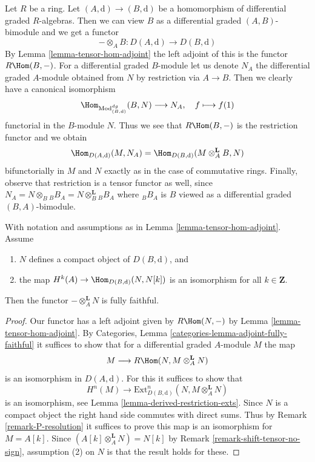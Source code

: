 \begin{example}
\label{example-map-hom-tensor}
Let $R$ be a ring. Let $(A, \text{d}) \to (B, \text{d})$ be a
homomorphism of differential graded $R$-algebras. Then we can
view $B$ as a differential graded $(A, B)$-bimodule and we get a functor
$$
- \otimes_A B : D(A, \text{d}) \longrightarrow D(B, \text{d})
$$
By Lemma \ref{lemma-tensor-hom-adjoint} the left adjoint of this
is the functor $R\Hom(B, -)$. For a differential graded $B$-module
let us denote $N_A$ the differential graded $A$-module obtained
from $N$ by restriction via $A \to B$. Then we clearly have
a canonical isomorphism
$$
\Hom_{\text{Mod}^{dg}_{(B, \text{d})}}(B, N) \longrightarrow N_A,\quad
f \longmapsto f(1)
$$
functorial in the $B$-module $N$. Thus we see that
$R\Hom(B, -)$ is the restriction functor and we obtain
$$
\Hom_{D(A, \text{d})}(M, N_A) =
\Hom_{D(B, \text{d})}(M \otimes^\mathbf{L}_A B, N)
$$
bifunctorially in $M$ and $N$ exactly as in the case of commutative rings.
Finally, observe that restriction is a tensor functor as well,
since $N_A = N \otimes_B {}_BB_A = N \otimes_B^\mathbf{L} {}_BB_A$
where ${}_BB_A$ is $B$ viewed as a differential graded $(B, A)$-bimodule.
\end{example}

\begin{lemma}
\label{lemma-tensor-with-compact-fully-faithful}
With notation and assumptions as in Lemma \ref{lemma-tensor-hom-adjoint}.
Assume
\begin{enumerate}
\item $N$ defines a compact object of $D(B, \text{d})$, and
\item the map $H^k(A) \to \Hom_{D(B, \text{d})}(N, N[k])$ is an
isomorphism for all $k \in \mathbf{Z}$.
\end{enumerate}
Then the functor $-\otimes_A^\mathbf{L} N$ is fully faithful.
\end{lemma}

\begin{proof}
Our functor has a left adjoint given by
$R\Hom(N, -)$ by Lemma \ref{lemma-tensor-hom-adjoint}.
By Categories, Lemma \ref{categories-lemma-adjoint-fully-faithful}
it suffices to show that for a differential graded $A$-module $M$
the map
$$
M \longrightarrow R\Hom(N, M \otimes_A^\mathbf{L} N)
$$
is an isomorphism in $D(A, \text{d})$. For this it suffices to show that
$$
H^n(M) \longrightarrow
\text{Ext}^n_{D(B, \text{d})}(N, M \otimes_A^\mathbf{L} N)
$$
is an isomorphism, see Lemma \ref{lemma-derived-restriction-exts}.
Since $N$ is a compact object the right hand side commutes
with direct sums. Thus by Remark \ref{remark-P-resolution}
it suffices to prove this map is an isomorphism for $M = A[k]$.
Since $(A[k] \otimes_A^\mathbf{L} N) = N[k]$ by
Remark \ref{remark-shift-tensor-no-sign},
assumption (2) on $N$ is that the result holds for these.
\end{proof}

